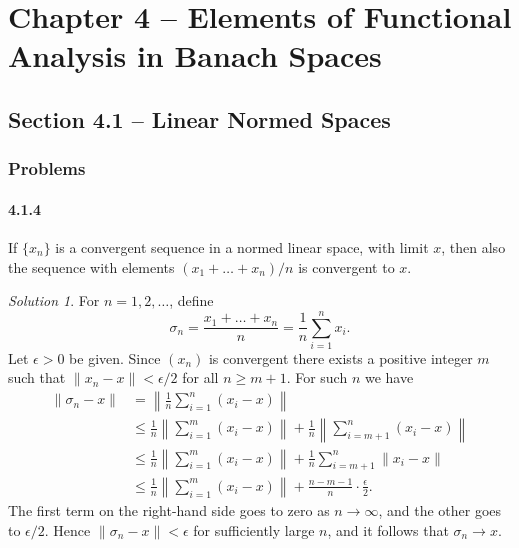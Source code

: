 \documentclass{report}
\newcommand{\norm}[1]{{\lVert #1 \rVert}}
\newcommand{\snorm}[1]{\left\lVert #1 \right\rVert}
\theoremstyle{remark}
\newtheorem*{solution}{Solution}
\begin{document}
\chapter*{Chapter 4 -- Elements of Functional Analysis in Banach Spaces}

\section*{Section 4.1 -- Linear Normed Spaces}

\subsection*{Problems}

\subsubsection*{4.1.4}
If $\{x_n\}$ is a convergent sequence in a normed linear space, with limit $x$, then also the sequence with elements $(x_1 + \dots + x_n)/n$ is convergent to $x$.

\begin{solution}
  For $n=1,2,\dots$, define
  \begin{equation*}
    \sigma_n = \frac{x_1 + \dots + x_n}{n} = \frac{1}{n} \sum_{i=1}^n x_i.
  \end{equation*}
  Let $\epsilon > 0$ be given. Since $(x_n)$ is convergent there exists a positive integer $m$ such that $\norm{x_n - x} < \epsilon/2$ for all $n \ge m+1$. For such $n$ we have
  \begin{equation*}
    \begin{split}
      \norm{\sigma_n - x} &= \snorm{\frac{1}{n} \sum_{i=1}^n (x_i - x)} \\
      &\le \frac{1}{n} \snorm{\sum_{i=1}^m (x_i - x)} + \frac{1}{n} \snorm{\sum_{i=m+1}^n (x_i - x)} \\
      &\le \frac{1}{n} \snorm{\sum_{i=1}^m (x_i - x)} + \frac{1}{n} \sum_{i=m+1}^n \norm{x_i - x} \\
      &\le \frac{1}{n} \snorm{\sum_{i=1}^m (x_i - x)} + \frac{n-m-1}{n} \cdot \frac{\epsilon}{2}.
    \end{split}
  \end{equation*}
  The first term on the right-hand side goes to zero as $n \to \infty$, and the other goes to $\epsilon/2$. Hence $\norm{\sigma_n - x} < \epsilon$ for sufficiently large $n$, and it follows that $\sigma_n \to x$.
\end{solution}
\end{document}
